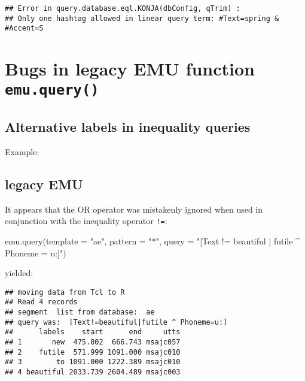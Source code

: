 \documentclass[
]{book}
\newenvironment{Shaded}{\begin{snugshade}}{\end{snugshade}}
\newcommand{\AttributeTok}[1]{\textcolor[rgb]{0.77,0.63,0.00}{#1}}
\newcommand{\FunctionTok}[1]{\textcolor[rgb]{0.00,0.00,0.00}{#1}}
\newcommand{\NormalTok}[1]{#1}
\newcommand{\StringTok}[1]{\textcolor[rgb]{0.31,0.60,0.02}{#1}}
\begin{document}
\begin{verbatim}
## Error in query.database.eql.KONJA(dbConfig, qTrim) :
## Only one hashtag allowed in linear query term: #Text=spring & #Accent=S
\end{verbatim}

\hypertarget{bugs-in-legacy-emu-function-emu.query}{%
\section{\texorpdfstring{Bugs in legacy EMU function \texttt{emu.query()}}{Bugs in legacy EMU function emu.query()}}\label{bugs-in-legacy-emu-function-emu.query}}

\hypertarget{alternative-labels-in-inequality-queries}{%
\subsection{Alternative labels in inequality queries}\label{alternative-labels-in-inequality-queries}}

Example:

\hypertarget{legacy-emu-1}{%
\subsection{legacy EMU}\label{legacy-emu-1}}

It appears that the OR operator \texttt{\textbar{}} was mistakenly ignored when used in conjunction with the inequality operator \texttt{!=}:

\begin{Shaded}
\begin{Highlighting}[]
\FunctionTok{emu.query}\NormalTok{(}\AttributeTok{template =} \StringTok{"ae"}\NormalTok{,}
          \AttributeTok{pattern =} \StringTok{"*"}\NormalTok{,}
          \AttributeTok{query =} \StringTok{"[Text != beautiful | futile \^{} Phoneme = u:]"}\NormalTok{)}
\end{Highlighting}
\end{Shaded}

yielded:

\begin{verbatim}
## moving data from Tcl to R
## Read 4 records
## segment  list from database:  ae
## query was:  [Text!=beautiful|futile ^ Phoneme=u:]
##      labels    start      end     utts
## 1       new  475.802  666.743 msajc057
## 2    futile  571.999 1091.000 msajc010
## 3        to 1091.000 1222.389 msajc010
## 4 beautiful 2033.739 2604.489 msajc003
\end{verbatim}
\end{document}
